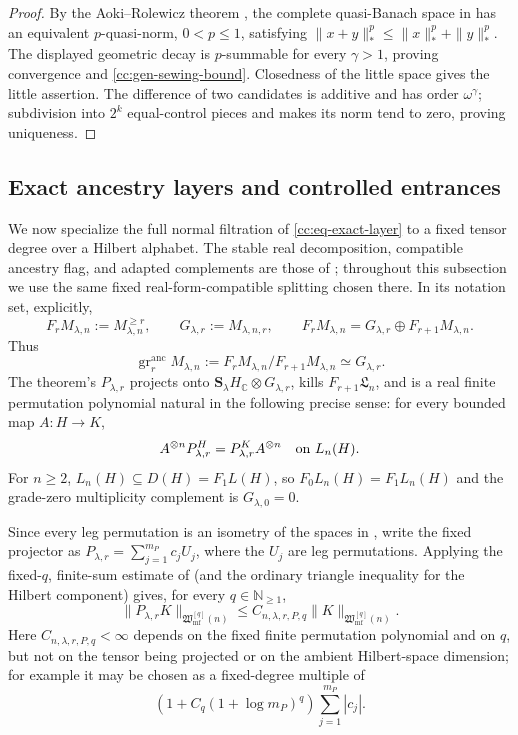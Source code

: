\documentclass[10pt,reqno]{amsart}
\theoremstyle{plain}
\theoremstyle{definition}
\theoremstyle{remark}
\begin{document}
\begin{proof}
By the Aoki--Rolewicz theorem \cite{KaltonPeckRoberts84}, the complete
quasi-Banach space in
 has an equivalent \(p\)-quasi-norm,
\(0<p\leq1\), satisfying
\(\|x+y\|_*^p\leq\|x\|_*^p+\|y\|_*^p\).  The displayed geometric
decay is \(p\)-summable for every \(\gamma>1\), proving convergence and
\eqref{cc:gen-sewing-bound}.  Closedness of the little space gives the
little assertion.  The difference of two candidates is additive and has
order \(\omega^\gamma\); subdivision into \(2^k\) equal-control pieces and
 makes its norm tend to zero, proving
uniqueness.
\end{proof}

\subsection{Exact ancestry layers and controlled entrances}
\label{cc:gen-subsection-critical-class}

We now specialize the full normal filtration of
\eqref{cc:eq-exact-layer} to a fixed tensor degree over a Hilbert
alphabet.  The stable real decomposition, compatible ancestry flag, and
adapted complements are those of
; throughout this subsection we use
the same fixed real-form-compatible splitting chosen there.  In its
notation set, explicitly,
\[
 F_rM_{\lambda,n}:=M^{\geq r}_{\lambda,n},
 \qquad
 G_{\lambda,r}:=M_{\lambda,n,r},
 \qquad
 F_rM_{\lambda,n}
 =G_{\lambda,r}\oplus F_{r+1}M_{\lambda,n}.
\]
Thus
\[
 \operatorname{gr}^{\mathrm{anc}}_rM_{\lambda,n}
 :=F_rM_{\lambda,n}/F_{r+1}M_{\lambda,n}
 \simeq G_{\lambda,r}.
\]
The theorem's \(P_{\lambda,r}\) projects onto
\({\mathbf S}_{\lambda}H_{\mathbb C}\otimes G_{\lambda,r}\), kills
\(F_{r+1}{\mathfrak L}_n\), and is a real finite permutation polynomial
natural in the following precise sense: for every bounded map
\(A:H\to K\),
\[
 A^{\otimes n}P_{\lambda,r}^{H}
 =P_{\lambda,r}^{K}A^{\otimes n}
 \quad\hbox{on }L_n(H).
\]
For \(n\geq2\), \(L_n(H)\subseteq D(H)=F_1L(H)\), so
\(F_0L_n(H)=F_1L_n(H)\) and the grade-zero multiplicity complement is
\(G_{\lambda,0}=0\).

Since every leg permutation is an isometry of the spaces in
, write the fixed projector as
\(P_{\lambda,r}=\sum_{j=1}^{m_P}c_jU_j\), where the \(U_j\) are leg
permutations.  Applying the fixed-\(q\), finite-sum estimate of
 (and the ordinary triangle
inequality for the Hilbert component) gives, for every
\(q\in\mathbb N_{\geq1}\),
\begin{equation}
 \|P_{\lambda,r}K\|_{\mathfrak W_{\mathrm{mf}}^{[q]}(n)}
 \leq C_{n,\lambda,r,P,q}
 \|K\|_{\mathfrak W_{\mathrm{mf}}^{[q]}(n)}.
 \label{cc:gen-projector-multiflat-bound}
\end{equation}
Here \(C_{n,\lambda,r,P,q}<\infty\) depends on the fixed finite
permutation polynomial and on \(q\), but not on the tensor being
projected or on the ambient Hilbert-space dimension; for example it may
be chosen as a fixed-degree multiple of
\[
 \left(1+C_q(1+\log m_P)^q\right)
 \sum_{j=1}^{m_P}|c_j|.
\]
\end{document}
